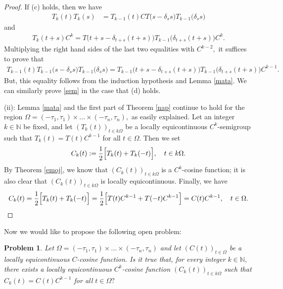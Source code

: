 \documentclass{amsart}
\newtheorem{prob}[thm]{Problem}
\theoremstyle{definition}
\theoremstyle{remark}
\numberwithin{equation}{section}
\begin{document}
\begin{proof}
If (c) holds, then we have
\begin{align*}
T_{k}(t)T_{k}(s) &=T_{k-1}(t)C T\bigl( s-\delta_{s}s\bigr)T_{k-1}\bigl( \delta_{s}s\bigr)
\end{align*}
and
\begin{align*}
T_{k}(t+s)C^{k}=T\bigl( t+s-\delta_{t+s}(t+s)\bigr)T_{k-1}\bigl( \delta_{t+s}(t+s)\bigr)C^{k} .
\end{align*}
Multiplying the right hand sides of the last two equalities with $C^{k-2},$ it suffices to prove that
\begin{align*}
T_{k-1}(t)  T_{k-1}\bigl( s-\delta_{s}s\bigr)T_{k-1}\bigl( \delta_{s}s\bigr)=T_{k-1}\bigl( t+s-\delta_{t+s}(t+s)\bigr)T_{k-1}\bigl( \delta_{t+s}(t+s)\bigr)C^{k-1}.
\end{align*}
But, this equality follows from the induction hypothesis and Lemma \ref{mata}.
We can similarly prove \eqref{sem} in the case that (d) holds.

(ii): Lemma \ref{mata} and the first part of Theorem \ref{nap} continue to hold for the region $\Omega =(-\tau_{1},\tau_{1}) \times ... \times (-\tau_{n},\tau_{n}),$ as easily explained. Let an  integer $k\in {\mathbb N} $ be fixed, and let $(T_{k}(t))_{t\in k\Omega}$ be a locally equicontinuous $C^{k}$-semigroup such that $T_{k}(t)=T(t)C^{k-1}$ for all $t\in \Omega.$  Then we set
$$
C_{k}(t):=\frac{1}{2}\Bigl[ T_{k}(t)+T_{k}(-t) \Bigr],\quad t\in k\Omega.
$$
By Theorem \ref{emoj}, we know that $(C_{k}(t))_{t\in k\Omega}$ is a $C^{k}$-cosine function; it is also clear that $(C_{k}(t))_{t\in k\Omega}$ is locally equicontinuous. Finally, we have
$$
C_{k}(t)=\frac{1}{2}\Bigl[ T_{k}(t)+T_{k}(-t) \Bigr]=\frac{1}{2}\Bigl[ T(t)C^{k-1}+T(-t)C^{k-1} \Bigr]=C(t)C^{k-1},\quad t\in \Omega.
$$
\end{proof}

Now we would like to propose the following open problem:

\begin{prob}\label{proba}
Let $\Omega =(-\tau_{1},\tau_{1}) \times ... \times (-\tau_{n},\tau_{n})$ and let $(C(t))_{t\in \Omega}$ 
be a locally equicontinuous $C$-cosine function. Is it true that, for every integer $k\in {\mathbb N},$ there exists a locally equicontinuous $C^{k}$-cosine function $(C_{k}(t))_{t\in k\Omega}$ such that $C_{k}(t)=C(t)C^{k-1}$ for all $t\in \Omega ?$ 
\end{prob}
\end{document}
